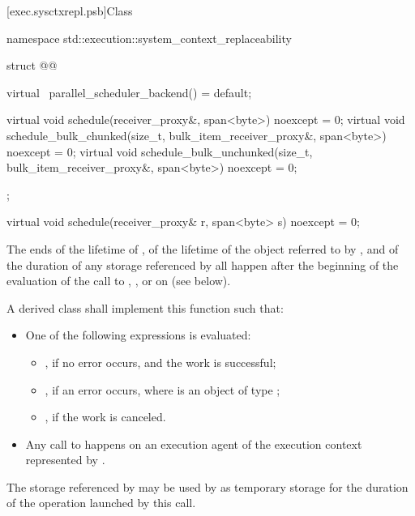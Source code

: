 [exec.sysctxrepl.psb]{Class }

\begin{codeblock}
namespace std::execution::system_context_replaceability {
  struct @@ {
    virtual ~parallel_scheduler_backend() = default;

    virtual void schedule(receiver_proxy&, span<byte>) noexcept = 0;
    virtual void schedule_bulk_chunked(size_t, bulk_item_receiver_proxy&,
                                       span<byte>) noexcept = 0;
    virtual void schedule_bulk_unchunked(size_t, bulk_item_receiver_proxy&,
                                         span<byte>) noexcept = 0;
  };
}
\end{codeblock}

%
\begin{itemdecl}
virtual void schedule(receiver_proxy& r, span<byte> s) noexcept = 0;
\end{itemdecl}

\begin{itemdescr}
\pnum
\expects
The ends
of the lifetime of ,
of the lifetime of the object referred to by , and
of the duration of any storage referenced by 
all happen after
the beginning of the evaluation of
the call to , , or 
on  (see below).

\pnum
\effects
A derived class shall implement this function such that:
\begin{itemize}
\item
One of the following expressions is evaluated:
\begin{itemize}
\item
{}, if no error occurs, and the work is successful;
\item
{}, if an error occurs,
where  is an object of type ;
\item
{}, if the work is canceled.
\end{itemize}
\item
Any call to  happens on
an execution agent of the execution context represented by .
\end{itemize}

\pnum
\remarks
The storage referenced by 
may be used by  as temporary storage
for the duration of the operation launched by this call.
\end{itemdescr}

